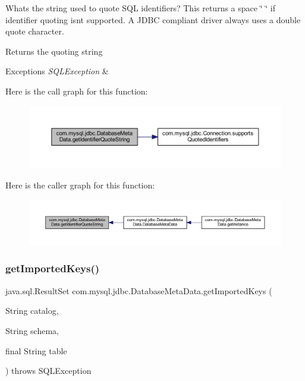 What\textquotesingle{}s the string used to quote S\+QL identifiers? This returns a space \char`\"{} \char`\"{} if identifier quoting isn\textquotesingle{}t supported. A J\+D\+BC compliant driver always uses a double quote character.

\begin{DoxyReturn}{Returns}
the quoting string 
\end{DoxyReturn}

\begin{DoxyExceptions}{Exceptions}
{\em S\+Q\+L\+Exception} & \\
\hline
\end{DoxyExceptions}
Here is the call graph for this function\+:\nopagebreak
\begin{figure}[H]
\begin{center}
\leavevmode
\includegraphics[width=350pt]{classcom_1_1mysql_1_1jdbc_1_1_database_meta_data_a1a0f564a2d0f6c011143f31f9a0128ef_cgraph}
\end{center}
\end{figure}
Here is the caller graph for this function\+:\nopagebreak
\begin{figure}[H]
\begin{center}
\leavevmode
\includegraphics[width=350pt]{classcom_1_1mysql_1_1jdbc_1_1_database_meta_data_a1a0f564a2d0f6c011143f31f9a0128ef_icgraph}
\end{center}
\end{figure}
\mbox{\label{classcom_1_1mysql_1_1jdbc_1_1_database_meta_data_a0161436eb7ad9574d25bd90730891e25}} 
\subsubsection{\texorpdfstring{get\+Imported\+Keys()}{getImportedKeys()}}
{\footnotesize\ttfamily java.\+sql.\+Result\+Set com.\+mysql.\+jdbc.\+Database\+Meta\+Data.\+get\+Imported\+Keys (\begin{DoxyParamCaption}\item[{String}]{catalog,  }\item[{String}]{schema,  }\item[{final String}]{table }\end{DoxyParamCaption}) throws S\+Q\+L\+Exception}

